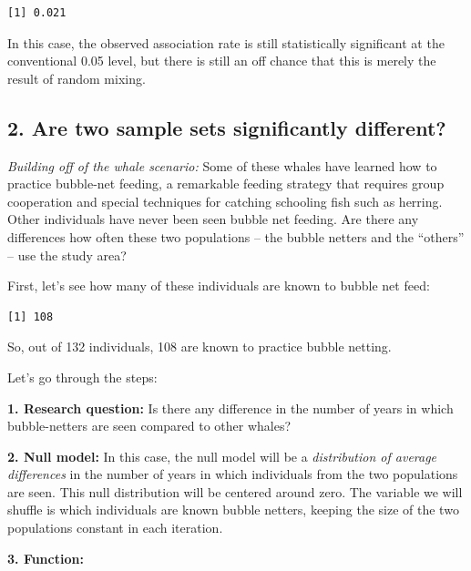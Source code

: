 \documentclass[
]{book}
\begin{document}
\begin{verbatim}
[1] 0.021
\end{verbatim}

In this case, the observed association rate is still statistically significant at the conventional 0.05 level, but there is still an off chance that this is merely the result of random mixing.

\hypertarget{are-two-sample-sets-significantly-different}{%
\subsection*{2. Are two sample sets significantly different?}\label{are-two-sample-sets-significantly-different}}

\emph{Building off of the whale scenario:} Some of these whales have learned how to practice bubble-net feeding, a remarkable feeding strategy that requires group cooperation and special techniques for catching schooling fish such as herring. Other individuals have never been seen bubble net feeding. Are there any differences how often these two populations -- the bubble netters and the ``others'' -- use the study area?

First, let's see how many of these individuals are known to bubble net feed:

\begin{verbatim}
[1] 108
\end{verbatim}

So, out of 132 individuals, 108 are known to practice bubble netting.

Let's go through the steps:

\textbf{1. Research question:} Is there any difference in the number of years in which bubble-netters are seen compared to other whales?

\textbf{2. Null model:} In this case, the null model will be a \emph{distribution of average differences} in the number of years in which individuals from the two populations are seen. This null distribution will be centered around zero. The variable we will shuffle is which individuals are known bubble netters, keeping the size of the two populations constant in each iteration.

\textbf{3. Function:}
\end{document}

